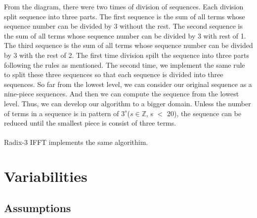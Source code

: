 \documentclass[12pt]{article}
\begin{document}
From the diagram, there were two times of division of sequences. Each division split sequence into three parts. The first sequence is the sum of all terms whose sequence number can be divided by 3 without the rest. The second sequence is the sum of all terms whose sequence number can be divided by 3 with rest of 1. The third sequence is the sum of all terms whose sequence number can be divided by 3 with the rest of 2. The first time division spilt the sequence into three parts following the rules as mentioned. The second time, we implement the same rule to split these three sequences so that each sequence is divided into three sequences. So far from the lowest level, we can consider our original sequence as a nine-piece sequences. And then we can compute the sequence from the lowest level. Thus, we can develop our algorithm to a bigger domain. Unless the number of terms
in a sequence is in pattern of  $3^s$($s\in\mathbb{Z}$, s $<$ 20), the sequence can be reduced until the smallest piece is consist of three terms.\\
\\
Radix-3 IFFT implements the same algorithim.\\



\section{Variabilities}

\subsection{Assumptions}
\end{document}
